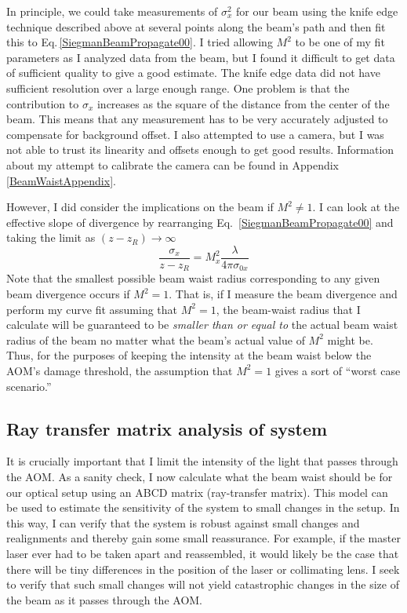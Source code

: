 In principle, we could take measurements of $\sigma_x^2$ for our beam using the knife edge technique described above at several points along the beam's path and then fit this to Eq.\,\ref{SiegmanBeamPropagate00}.
I tried allowing $M^2$ to be one of my fit parameters as I analyzed data from the beam, but I found it difficult to get data of sufficient quality to give a good estimate. The knife edge data did not have sufficient resolution over a large enough range. One problem is that the contribution to $\sigma_x$ increases as the square of the distance from the center of the beam. This means that any measurement has to be very accurately adjusted to compensate for background offset. I also attempted to use a camera, but I was not able to trust its linearity and offsets enough to get good results. Information about my attempt to calibrate the camera can be found in Appendix\,\ref{BeamWaistAppendix}. 

However, I did consider the implications on the beam if $M^2\neq 1$. I can look at the effective slope of divergence by rearranging Eq.\ \ref{SiegmanBeamPropagate00} and taking the limit as $(z-z_R) \rightarrow \infty$
\begin{equation}
\frac{\sigma_x}{z-z_R}=M_x^2 \frac{\lambda }{4 \pi \sigma_{0x}} \label{SiegmanBeamSlope}
\end{equation}
Note that the smallest possible beam waist radius corresponding to any given beam divergence occurs if $M^2=1$. That is, if I measure the beam divergence and perform my curve fit assuming that $M^2=1$, the beam-waist radius that I calculate will be guaranteed to be \emph{smaller than or equal to} the actual beam waist radius of the beam no matter what the beam's actual value of $M^2$ might be. Thus, for the purposes of keeping the intensity at the beam waist below the AOM's damage threshold, the assumption that $M^2=1$ gives a sort of ``worst case scenario.'' 

\subsection{Ray transfer matrix analysis of system}
It is crucially important that I limit the intensity of the light that passes through the AOM. As a sanity check, I now calculate what the beam waist should be for our optical setup using an ABCD matrix (ray-transfer matrix). This model can be used to estimate the sensitivity of the system to small changes in the setup. In this way, I can verify that the system is robust against small changes and realignments and thereby gain some small reassurance. For example, if the master laser ever had to be taken apart and reassembled, it would likely be the case that there will be tiny differences in the position of the laser or collimating lens. I seek to verify that such small changes will not yield catastrophic changes in the size of the beam as it passes through the AOM.  

